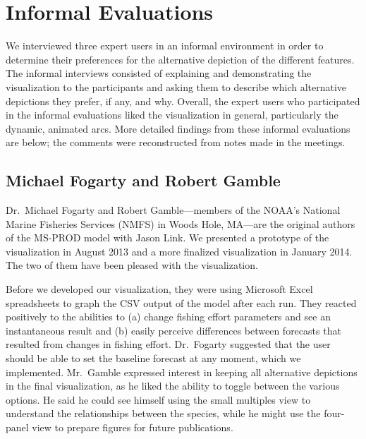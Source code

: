 \section{Informal Evaluations}

We interviewed three expert users in an informal environment in order to determine their preferences for the alternative depiction of the different features.  The informal interviews consisted of explaining and demonstrating the visualization to the participants and asking them to describe which alternative depictions they prefer, if any, and why.  Overall, the expert users who participated in the informal evaluations liked the visualization in general, particularly the dynamic, animated arcs.  More detailed findings from these informal evaluations are below; the comments were reconstructed from notes made in the meetings.

\subsection{Michael Fogarty and Robert Gamble} %

Dr.\ Michael Fogarty and Robert Gamble---members of the NOAA's National Marine Fisheries Services (NMFS) in Woods Hole, MA---are the original authors of the MS-PROD model with Jason Link.  We presented a prototype of the visualization in August 2013 and a more finalized visualization in January 2014.  The two of them have been pleased with the visualization.

Before we developed our visualization, they were using Microsoft Excel spreadsheets to graph the CSV output of the model after each run.  They reacted positively to the abilities to (a) change fishing effort parameters and see an instantaneous result and (b) easily perceive differences between forecasts that resulted from changes in fishing effort.  Dr.\ Fogarty suggested that the user should be able to set the baseline forecast at any moment, which we implemented.  Mr.\ Gamble expressed interest in keeping all alternative depictions in the final visualization, as he liked the ability to toggle between the various options.  He said he could see himself using the small multiples view to understand the relationships between the species, while he might use the four-panel view to prepare figures for future publications.

